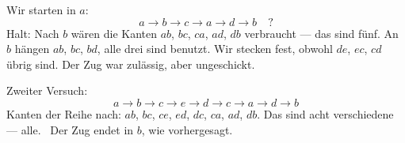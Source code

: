 \begin{aufgabe}
Wir starten in $a$:
\[ a \to b \to c \to a \to d \to b \quad ? \]
Halt: Nach $b$ wären die Kanten $ab$, $bc$, $ca$, $ad$, $db$ verbraucht --- das sind fünf. An $b$ hängen $ab$, $bc$, $bd$, alle drei sind benutzt. Wir stecken fest, obwohl $de$, $ec$, $cd$ übrig sind. Der Zug war zulässig, aber ungeschickt.

Zweiter Versuch:
\[ a \to b \to c \to e \to d \to c \to a \to d \to b \]
Kanten der Reihe nach: $ab$, $bc$, $ce$, $ed$, $dc$, $ca$, $ad$, $db$. Das sind acht verschiedene --- alle. \checkmark\ Der Zug endet in $b$, wie vorhergesagt.

\begin{center}
\begin{minipage}{0.86\textwidth}
\end{minipage}
\end{center}
\end{aufgabe}

